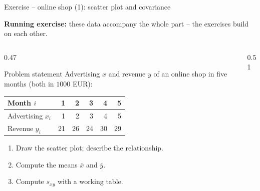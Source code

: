\documentclass[aspectratio=169,11pt]{beamer}
\newcommand{\runningex}[1]{{\footnotesize\color{hsbiblaudunkel}\textbf{Running exercise:} #1\par}\smallskip}
\begin{document}
\begin{frame}{Exercise -- online shop (1): scatter plot and covariance}
  \runningex{these data accompany the whole part -- the exercises build on each other.}
  \begin{columns}[T]
    \begin{column}{0.47\textwidth}
      \small
      \begin{block}{Problem statement}
        Advertising $x$ and revenue $y$ of an online shop in five months
        (both in $1000$ EUR):\par
        \smallskip
        {\centering\renewcommand{\arraystretch}{1.0}\setlength{\tabcolsep}{4pt}%
        \begin{tabular}{l*{5}{r}}
          \toprule
          Month $i$         & 1  & 2  & 3  & 4  & 5  \\
          \midrule
          Advertising $x_i$ & 1  & 2  & 3  & 4  & 5  \\
          Revenue $y_i$     & 21 & 26 & 24 & 30 & 29 \\
          \bottomrule
        \end{tabular}\par}
        \begin{enumerate}
          \setlength{\itemsep}{0pt}
          \item Draw the scatter plot; describe the relationship.
          \item Compute the means $\bar{x}$ and $\bar{y}$.
          \item Compute $s_{xy}$ with a working table.
        \end{enumerate}
      \end{block}
    \end{column}
    \begin{column}{0.51\textwidth}
    \end{column}
  \end{columns}
\end{frame}
\end{document}
